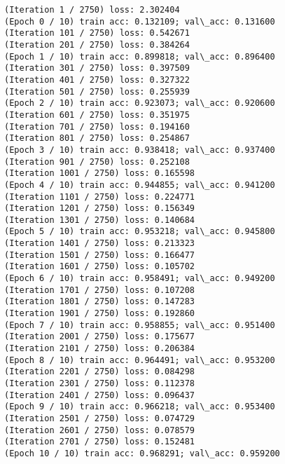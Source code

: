 \documentclass[11pt]{article}
\begin{document}
    \begin{Verbatim}[commandchars=\\\{\}]
(Iteration 1 / 2750) loss: 2.302404
(Epoch 0 / 10) train acc: 0.132109; val\_acc: 0.131600
(Iteration 101 / 2750) loss: 0.542671
(Iteration 201 / 2750) loss: 0.384264
(Epoch 1 / 10) train acc: 0.899818; val\_acc: 0.896400
(Iteration 301 / 2750) loss: 0.397509
(Iteration 401 / 2750) loss: 0.327322
(Iteration 501 / 2750) loss: 0.255939
(Epoch 2 / 10) train acc: 0.923073; val\_acc: 0.920600
(Iteration 601 / 2750) loss: 0.351975
(Iteration 701 / 2750) loss: 0.194160
(Iteration 801 / 2750) loss: 0.254867
(Epoch 3 / 10) train acc: 0.938418; val\_acc: 0.937400
(Iteration 901 / 2750) loss: 0.252108
(Iteration 1001 / 2750) loss: 0.165598
(Epoch 4 / 10) train acc: 0.944855; val\_acc: 0.941200
(Iteration 1101 / 2750) loss: 0.224771
(Iteration 1201 / 2750) loss: 0.156349
(Iteration 1301 / 2750) loss: 0.140684
(Epoch 5 / 10) train acc: 0.953218; val\_acc: 0.945800
(Iteration 1401 / 2750) loss: 0.213323
(Iteration 1501 / 2750) loss: 0.166477
(Iteration 1601 / 2750) loss: 0.105702
(Epoch 6 / 10) train acc: 0.958491; val\_acc: 0.949200
(Iteration 1701 / 2750) loss: 0.107208
(Iteration 1801 / 2750) loss: 0.147283
(Iteration 1901 / 2750) loss: 0.192860
(Epoch 7 / 10) train acc: 0.958855; val\_acc: 0.951400
(Iteration 2001 / 2750) loss: 0.175677
(Iteration 2101 / 2750) loss: 0.206384
(Epoch 8 / 10) train acc: 0.964491; val\_acc: 0.953200
(Iteration 2201 / 2750) loss: 0.084298
(Iteration 2301 / 2750) loss: 0.112378
(Iteration 2401 / 2750) loss: 0.096437
(Epoch 9 / 10) train acc: 0.966218; val\_acc: 0.953400
(Iteration 2501 / 2750) loss: 0.074729
(Iteration 2601 / 2750) loss: 0.078579
(Iteration 2701 / 2750) loss: 0.152481
(Epoch 10 / 10) train acc: 0.968291; val\_acc: 0.959200
    \end{Verbatim}
\end{document}
